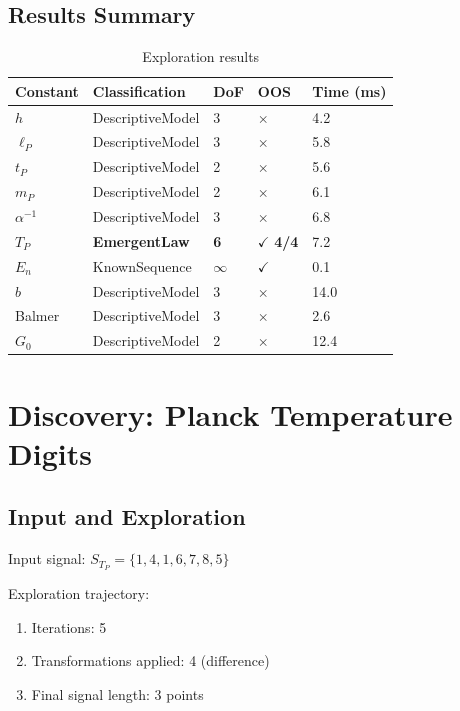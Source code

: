 \documentclass[11pt,a4paper]{article}
\begin{document}
\subsection{Results Summary}

\begin{table}[h]
\centering
\caption{Exploration results}
\label{tab:results}
\begin{tabular}{@{}lllll@{}}
\toprule
Constant & Classification & DoF & OOS & Time (ms) \\
\midrule
$h$ & DescriptiveModel & 3 & $\times$ & 4.2 \\
$\ell_P$ & DescriptiveModel & 3 & $\times$ & 5.8 \\
$t_P$ & DescriptiveModel & 2 & $\times$ & 5.6 \\
$m_P$ & DescriptiveModel & 2 & $\times$ & 6.1 \\
$\alpha^{-1}$ & DescriptiveModel & 3 & $\times$ & 6.8 \\
\textbf{$T_P$} & \textbf{EmergentLaw} & \textbf{6} & $\checkmark$ \textbf{4/4} & 7.2 \\
$E_n$ & KnownSequence & $\infty$ & $\checkmark$ & 0.1 \\
$b$ & DescriptiveModel & 3 & $\times$ & 14.0 \\
Balmer & DescriptiveModel & 3 & $\times$ & 2.6 \\
$G_0$ & DescriptiveModel & 2 & $\times$ & 12.4 \\
\bottomrule
\end{tabular}
\end{table}

\section{Discovery: Planck Temperature Digits}
\label{sec:discovery}

\subsection{Input and Exploration}

Input signal: $S_{T_P} = \{1, 4, 1, 6, 7, 8, 5\}$

Exploration trajectory:
\begin{enumerate}
    \item Iterations: 5
    \item Transformations applied: 4 (difference)
    \item Final signal length: 3 points
\end{enumerate}
\end{document}
